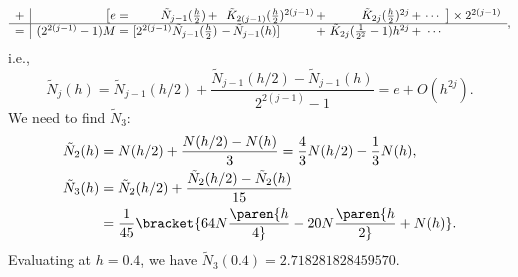 \documentclass{homework}
\begin{document}
{\begin{enumerate}[label={(\alph*)},topsep=0pt]
\[\begin{array}{r|r@{\,\,}r@{\ }r@{\ }r@{\ }r@{\ }l}
                + & \big[ e =  & \tilde N_{j-1}(\frac h2) \,+                & \tilde  K_{2(j-1)} (\frac h2)^{2(j-1)} \,+ & \tilde K_{2j} (\frac h2)^{2j} \,+ & \cdots & \big] \times 2^{2(j-1)} \\\hline
                = & (2^{2(j-1)}-1)M = & [2^{2(j-1)}\tilde N_{j-1}(\frac h2) &-\, \tilde N_{j-1}(h)]  \qquad\quad+              & \tilde K_{2j}(\frac 1{2^2}-1)h^{2j}\,+   & \cdots
            \end{array},\]
            i.e., $$\tilde N_j(h) = \tilde N_{j-1}(h/2) + \frac{\tilde N_{j-1}(h/2) - \tilde N_{j-1}(h)}{2^{2(j-1)}-1} = e+O(h^{2j}).$$
            We need to find $\tilde N_3$:
            \begin{align*}
                \tilde N_2(h) &= N(h/2) + \frac{N(h/2)-N(h)}{3} = \frac43 N(h/2) - \frac13 N(h), \\
                \tilde N_3(h) &= \tilde N_2(h/2) + \frac{\tilde N_2(h/2)-\tilde N_2(h)}{15}
                \\ &= \frac 1{45}\bracket { 64N\paren{h\over 4} - 20N\paren{h\over 2} + N(h) }.
            \end{align*}
            Evaluating at $h=0.4$, we have $\tilde N_3(0.4) = 2.718281828459570.$
     \end{enumerate}
}

\end{document}
